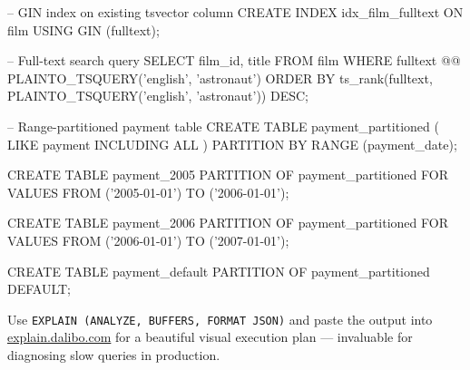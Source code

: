 \documentclass[11pt,a4paper]{article}
\begin{document}
\begin{sqlcode}[title={\texttt{</>}\quad Example --- Full-Text Search with GIN}]
-- GIN index on existing tsvector column
CREATE INDEX idx_film_fulltext ON film USING GIN (fulltext);

-- Full-text search query
SELECT film_id, title
FROM   film
WHERE  fulltext @@ PLAINTO_TSQUERY('english', 'astronaut')
ORDER  BY ts_rank(fulltext, PLAINTO_TSQUERY('english', 'astronaut')) DESC;

-- Range-partitioned payment table
CREATE TABLE payment_partitioned (
    LIKE payment INCLUDING ALL
) PARTITION BY RANGE (payment_date);

CREATE TABLE payment_2005
    PARTITION OF payment_partitioned
    FOR VALUES FROM ('2005-01-01') TO ('2006-01-01');

CREATE TABLE payment_2006
    PARTITION OF payment_partitioned
    FOR VALUES FROM ('2006-01-01') TO ('2007-01-01');

CREATE TABLE payment_default
    PARTITION OF payment_partitioned DEFAULT;
\end{sqlcode}

\begin{tipbox}
Use \texttt{EXPLAIN (ANALYZE, BUFFERS, FORMAT JSON)} and paste the output into \href{https://explain.dalibo.com}{explain.dalibo.com} for a beautiful visual execution plan --- invaluable for diagnosing slow queries in production.
\end{tipbox}

\newpage
\thispagestyle{empty}
\pagecolor{PgDark}

\end{document}
